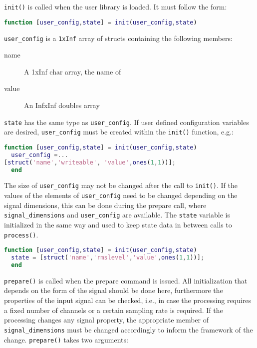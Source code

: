 \documentclass[11pt,a4paper,twoside]{article}
\newcommand{\+}{\discretionary{\mbox{\scriptsize$\hookleftarrow$}}{}{}}
\begin{document}
\texttt{init()} is called when the user library is loaded. It must follow the form:
\begin{lstlisting}[language=Matlab]
  function [user_config,state] = init(user_config,state)
\end{lstlisting}
\texttt{user\_config} is a \texttt{1xInf} array of structs containing the following members:
\begin{description}
\item[name] A 1xInf char array, the name of 
\item[value] An InfxInf doubles array
\end{description}
\texttt{state} has the same type as \texttt{user\_config}.
If user defined configuration variables are desired, \texttt{user\_config} must
be created within the \texttt{init()} function, e.g.:
\begin{lstlisting}[language=Matlab]
  function [user_config,state] = init(user_config,state)
  user_config =...
[struct('name','writeable', 'value',ones(1,1))];
  end
\end{lstlisting}
The size of \texttt{user\_config} may not be changed after the call to \texttt{init()}. If the values of the
elements of \texttt{user\_config} need to be changed depending on the signal dimensions,
this can be done during the prepare call, where \texttt{signal\_dimensions} and
\texttt{user\_config} are available.
The \texttt{state} variable is initialized in the same way and used to keep
state data in between calls to \texttt{process()}.
\begin{lstlisting}[language=Matlab]
  function [user_config,state] = init(user_config,state)
  state = [struct('name','rmslevel','value',ones(1,1))];
  end
\end{lstlisting}
\texttt{prepare()} is called when the prepare command is issued. All
initialization that depends on the form of the signal should be done here,
furthermore the properties of the input signal can be checked, i.e., in case the 
processing requires a fixed number of channels or a certain sampling rate is
required. If the processing changes any signal property, the
appropriate member of \texttt{signal\_dimensions} must be changed accordingly to
inform the \mha{} framework of the change.
\texttt{prepare()} takes two arguments:
\end{document}
